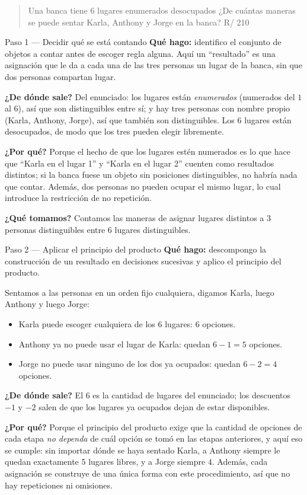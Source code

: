 \documentclass[11pt]{article}
\begin{document}
\begin{quote}
Una banca tiene 6 lugares enumerados desocupados ¿De cuántas maneras se puede sentar Karla, Anthony y Jorge en la banca? \hfill R/ 210
\end{quote}

\begin{paso}{Paso 1 --- Decidir qué se está contando}
\textbf{Qué hago:} identifico el conjunto de objetos a contar antes de escoger regla alguna. Aquí un ``resultado'' es una asignación que le da a cada una de las tres personas un lugar de la banca, sin que dos personas compartan lugar.

\textbf{¿De dónde sale?} Del enunciado: los lugares están \emph{enumerados} (numerados del $1$ al $6$), así que son distinguibles entre sí; y hay tres personas con nombre propio (Karla, Anthony, Jorge), así que también son distinguibles. Los $6$ lugares están desocupados, de modo que los tres pueden elegir libremente.

\textbf{¿Por qué?} Porque el hecho de que los lugares estén numerados es lo que hace que ``Karla en el lugar 1'' y ``Karla en el lugar 2'' cuenten como resultados distintos; si la banca fuese un objeto sin posiciones distinguibles, no habría nada que contar. Además, dos personas no pueden ocupar el mismo lugar, lo cual introduce la restricción de no repetición.

\textbf{¿Qué tomamos?} Contamos las maneras de asignar lugares distintos a $3$ personas distinguibles entre $6$ lugares distinguibles.
\end{paso}

\begin{paso}{Paso 2 --- Aplicar el principio del producto}
\textbf{Qué hago:} descompongo la construcción de un resultado en decisiones sucesivas y aplico el principio del producto.

Sentamos a las personas en un orden fijo cualquiera, digamos Karla, luego Anthony y luego Jorge:
\begin{itemize}[leftmargin=1.3em,itemsep=1pt]
\item Karla puede escoger cualquiera de los $6$ lugares: $6$ opciones.
\item Anthony ya no puede usar el lugar de Karla: quedan $6-1=5$ opciones.
\item Jorge no puede usar ninguno de los dos ya ocupados: quedan $6-2=4$ opciones.
\end{itemize}

\textbf{¿De dónde sale?} El $6$ es la cantidad de lugares del enunciado; los descuentos $-1$ y $-2$ salen de que los lugares ya ocupados dejan de estar disponibles.

\textbf{¿Por qué?} Porque el principio del producto exige que la cantidad de opciones de cada etapa \emph{no dependa} de cuál opción se tomó en las etapas anteriores, y aquí eso se cumple: sin importar dónde se haya sentado Karla, a Anthony siempre le quedan exactamente $5$ lugares libres, y a Jorge siempre $4$. Además, cada asignación se construye de una única forma con este procedimiento, así que no hay repeticiones ni omisiones.
\end{paso}
\end{document}
